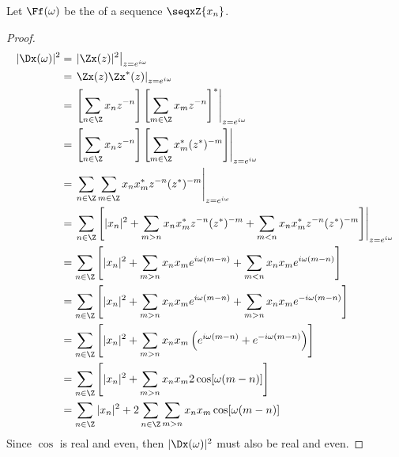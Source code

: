 \begin{lemma}
\label{lem:even}
Let $\Ff(\omega)$ be the   of a sequence $\seqxZ{x_n}$. 
\end{lemma}
\begin{proof}
\begin{align*}
   |\Dx(\omega)|^2
     &=  \left. |\Zx(z)|^2  \right|_{z=e^{i\omega}}
   \\&=  \left. \Zx(z)\Zx^\ast(z)  \right|_{z=e^{i\omega}}
   \\&=  \left.
         \left[ \sum_{n\in\Z}  x_n z^{-n} \right]
         \left[ \sum_{m\in\Z}  x_m z^{-n} \right]^\ast
         \right|_{z=e^{i\omega}}
   \\&=  \left.
         \left[ \sum_{n\in\Z}  x_n z^{-n} \right]
         \left[ \sum_{m\in\Z}  x^\ast_m (z^\ast)^{-m} \right]
         \right|_{z=e^{i\omega}}
   \\&=  \left.
         \sum_{n\in\Z} \sum_{m\in\Z}  x_n x^\ast_m z^{-n} (z^\ast)^{-m}
         \right|_{z=e^{i\omega}}
   \\&=  \left.\sum_{n\in\Z} \left[
            | x_n|^2 +
            \sum_{m>n}  x_n x^\ast_m z^{-n} (z^\ast)^{-m} +
            \sum_{m<n}  x_n x^\ast_m z^{-n} (z^\ast)^{-m} 
            \right]
         \right|_{z=e^{i\omega}}
   \\&=  \sum_{n\in\Z}
         \left[
            | x_n|^2 +
            \sum_{m>n}  x_n  x_m e^{i\omega (m-n)}  +
            \sum_{m<n}  x_n  x_m e^{i\omega (m-n)}
         \right]
   \\&=  \sum_{n\in\Z}
         \left[
            | x_n|^2 +
            \sum_{m>n}  x_n  x_m e^{ i\omega(m-n)}  +
            \sum_{m>n}  x_n  x_m e^{-i\omega(m-n)}
         \right]
   \\&=  \sum_{n\in\Z}
         \left[
            | x_n|^2 +
            \sum_{m>n}  x_n  x_m
            \left( e^{i\omega (m-n)}  + e^{-i\omega(m-n)}  \right)
         \right]
   \\&=  \sum_{n\in\Z}
         \left[
            | x_n|^2 + \sum_{m>n}  x_n  x_m 2\cos[\omega(m-n)]
         \right]
   \\&=  \sum_{n\in\Z} | x_n|^2 +
         2\sum_{n\in\Z} \sum_{m>n}  x_n  x_m \cos[\omega(m-n)]
\end{align*}
Since $\cos$ is real and even, then $|\Dx(\omega)|^2$
must also be real and even.
\end{proof}





